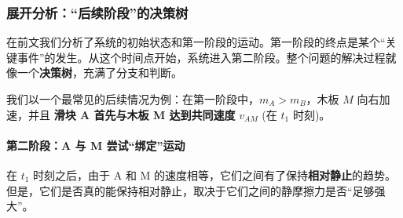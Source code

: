 \documentclass[a4paper,11pt]{ctexart}
\begin{document}
\subsubsection{展开分析：“后续阶段”的决策树}
\label{sec:subsequent_phases}
在前文我们分析了系统的初始状态和第一阶段的运动。第一阶段的终点是某个“关键事件”的发生。从这个时间点开始，系统进入第二阶段。整个问题的解决过程就像一个\textbf{决策树}，充满了分支和判断。

我们以一个最常见的后续情况为例：在第一阶段中，$m_A > m_B$，木板 $M$ 向右加速，并且 \textbf{滑块 A 首先与木板 M 达到共同速度} $v_{AM}$ (在 $t_1$ 时刻)。

\paragraph{第二阶段：A 与 M 尝试“绑定”运动}
在 $t_1$ 时刻之后，由于 A 和 M 的速度相等，它们之间有了保持\textbf{相对静止}的趋势。但是，它们是否真的能保持相对静止，取决于它们之间的静摩擦力是否“足够强大”。
\end{document}
